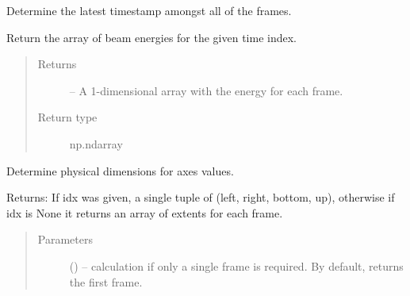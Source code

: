 \documentclass[letterpaper,10pt,english]{sphinxmanual}
\begin{document}
\begin{fulllineitems}
\begin{fulllineitems}
\begin{quote}
\begin{description}
\begin{itemize}
\end{itemize}

\end{description}\end{quote}

\end{fulllineitems}


\begin{fulllineitems}
\label{\detokenize{xanespy:xanespy.xanes_frameset.XanesFrameset.endtime}}
Determine the latest timestamp amongst all of the frames.

\end{fulllineitems}


\begin{fulllineitems}
\label{\detokenize{xanespy:xanespy.xanes_frameset.XanesFrameset.energies}}
Return the array of beam energies for the given time index.
\begin{quote}\begin{description}
\item[{Returns}] \leavevmode
{} -- A 1-dimensional array with the energy for each frame.

\item[{Return type}] \leavevmode
np.ndarray

\end{description}\end{quote}

\end{fulllineitems}


\begin{fulllineitems}
\label{\detokenize{xanespy:xanespy.xanes_frameset.XanesFrameset.extent}}
Determine physical dimensions for axes values.

Returns: If idx was given, a single tuple of (left, right,
bottom, up), otherwise if idx is None it returns an array of
extents for each frame.
\begin{quote}\begin{description}
\item[{Parameters}] \leavevmode
{} () -- calculation if only a single frame is required. By default,
returns the first frame.


\end{description}
\end{quote}
\end{fulllineitems}
\end{fulllineitems}
\end{document}
